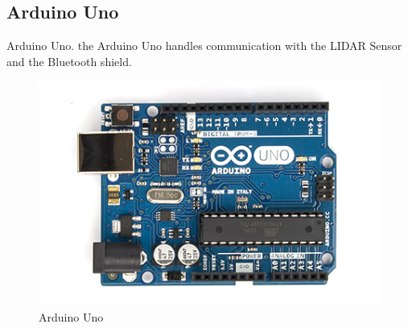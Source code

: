 \subsection{Arduino Uno}
Arduino Uno\cite{ArduinoUno}.
the Arduino Uno handles communication with the LIDAR Sensor and the Bluetooth shield.
\begin{figure}[H]
\centering
\includegraphics[scale=0.5]{billeder/ArduinoUno}
\caption{Arduino Uno}
\label{fig:ArduinoUno}
\end{figure}

